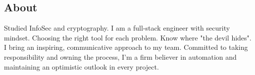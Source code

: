 \documentclass[letterpaper, 11pt]{article}
\begin{document}

\subsection*{About}

Studied InfoSec and cryptography. I am a full-stack engineer with security mindset.
Choosing the right tool for each problem. Know where "the devil hides". I bring an inspiring, communicative approach to my team.
Committed to taking responsibility and owning the process, I'm a firm believer in automation and maintaining an optimistic outlook in every project.









% 

% 




\end{document}
